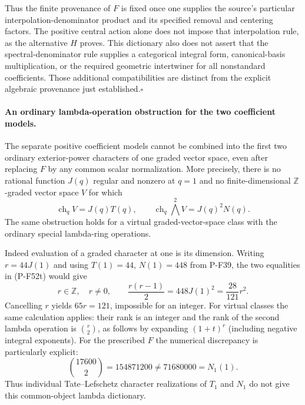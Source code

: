 \documentclass[11pt,a4paper]{article}
\begin{document}
Thus the finite provenance of $F$ is fixed once one supplies the
source's particular interpolation-denominator product and its
specified removal and centering factors. The positive central
action alone does not impose that interpolation rule, as the
alternative $H$ proves. This dictionary also does not assert that
the spectral-denominator rule supplies a categorical integral form,
canonical-basis multiplication, or the required geometric
intertwiner for all nonstandard coefficients. Those additional
compatibilities are distinct from the explicit algebraic
provenance just established.\hfill$\square$

\paragraph{An ordinary lambda-operation obstruction for the two coefficient models.}
The separate positive coefficient models cannot be combined into
the first two ordinary exterior-power characters of one graded
vector space, even after replacing $F$ by any common scalar
normalization. More precisely, there is no rational function
$J(q)$ regular and nonzero at $q=1$ and no finite-dimensional
$\mathbb Z$-graded vector space $V$ for which
\[
 \operatorname{ch}_q V=J(q)T(q),\qquad
 \operatorname{ch}_q\bigwedge^2V=J(q)^2N(q).
                                                        \tag{P-F52t}
\]
The same obstruction holds for a virtual graded-vector-space
class with the ordinary special lambda-ring operations.

Indeed evaluation of a graded character at one is its dimension.
Writing $r=44J(1)$ and using $T(1)=44$, $N(1)=448$ from
P-F39, the two equalities in (P-F52t) would give
\[
 r\in\mathbb Z,\quad r\ne0,\qquad
 \frac{r(r-1)}2=448J(1)^2=\frac{28}{121}r^2.
                                                        \tag{P-F52u}
\]
Cancelling $r$ yields $65r=121$, impossible for an integer.
For virtual classes the same calculation applies: their rank
is an integer and the rank of the second lambda operation is
$\binom r2$, as follows by expanding
$(1+t)^{r}$ (including negative integral exponents).
For the prescribed $F$ the numerical discrepancy is particularly
explicit:
\[
 \binom{17600}{2}=154871200\ne71680000=N_1(1).
                                                        \tag{P-F52v}
\]
Thus individual Tate--Lefschetz character realizations of
$T_1$ and $N_1$ do not give this common-object lambda
dictionary.
\end{document}
